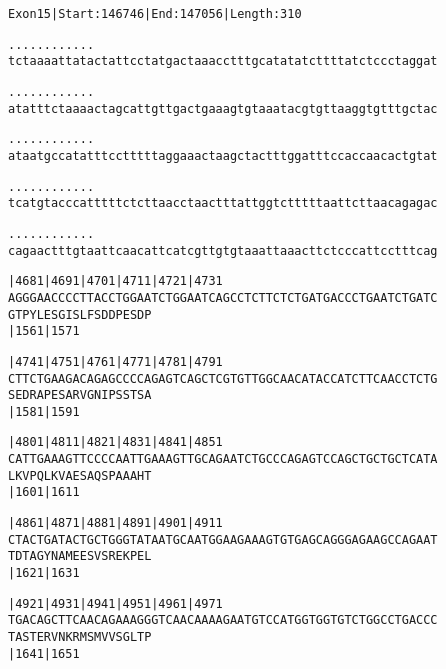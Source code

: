 \documentclass{article}
\begin{document}
\newpage
\begin{alltt}
Exon 15 | Start: 146746 | End: 147056 | Length: 310

.    .    .    .    .    .    .    .    .    .    .    .    
tctaaaattatactattcctatgactaaacctttgcatatatcttttatctccctaggat

.    .    .    .    .    .    .    .    .    .    .    .    
atatttctaaaactagcattgttgactgaaagtgtaaatacgtgttaaggtgtttgctac

.    .    .    .    .    .    .    .    .    .    .    .    
ataatgccatatttcctttttaggaaactaagctactttggatttccaccaacactgtat

.    .    .    .    .    .    .    .    .    .    .    .    
tcatgtacccatttttctcttaacctaactttattggtctttttaattcttaacagagac

.    .    .    .    .    .    .    .    .    .    .    .    
cagaactttgtaattcaacattcatcgttgtgtaaattaaacttctcccattcctttcag

     |4681     |4691     |4701     |4711     |4721     |4731
AGGGAACCCCTTACCTGGAATCTGGAATCAGCCTCTTCTCTGATGACCCTGAATCTGATC
  G  T  P  Y  L  E  S  G  I  S  L  F  S  D  D  P  E  S  D  P
     |1561                         |1571                    

     |4741     |4751     |4761     |4771     |4781     |4791
CTTCTGAAGACAGAGCCCCAGAGTCAGCTCGTGTTGGCAACATACCATCTTCAACCTCTG
  S  E  D  R  A  P  E  S  A  R  V  G  N  I  P  S  S  T  S  A
     |1581                         |1591                    

     |4801     |4811     |4821     |4831     |4841     |4851
CATTGAAAGTTCCCCAATTGAAAGTTGCAGAATCTGCCCAGAGTCCAGCTGCTGCTCATA
  L  K  V  P  Q  L  K  V  A  E  S  A  Q  S  P  A  A  A  H  T
     |1601                         |1611                    

     |4861     |4871     |4881     |4891     |4901     |4911
CTACTGATACTGCTGGGTATAATGCAATGGAAGAAAGTGTGAGCAGGGAGAAGCCAGAAT
  T  D  T  A  G  Y  N  A  M  E  E  S  V  S  R  E  K  P  E  L
     |1621                         |1631                    

     |4921     |4931     |4941     |4951     |4961     |4971
TGACAGCTTCAACAGAAAGGGTCAACAAAAGAATGTCCATGGTGGTGTCTGGCCTGACCC
  T  A  S  T  E  R  V  N  K  R  M  S  M  V  V  S  G  L  T  P
     |1641                         |1651                    

\end{alltt}
\newpage
\end{document}
